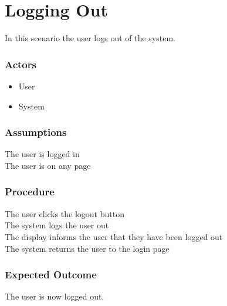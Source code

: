 \section{Logging Out}
In this scenario the user logs out of the system.

\subsubsection{Actors}
\begin{itemize}
	\item User
	\item System
\end{itemize}


\subsubsection{Assumptions}

The user is logged in\\
The user is on any page

\subsubsection{Procedure}

The user clicks the logout button\\
The system logs the user out\\
The display informs the user that they have been logged out\\
The system returns the user to the login page

\subsubsection{Expected Outcome}

The user is now logged out.